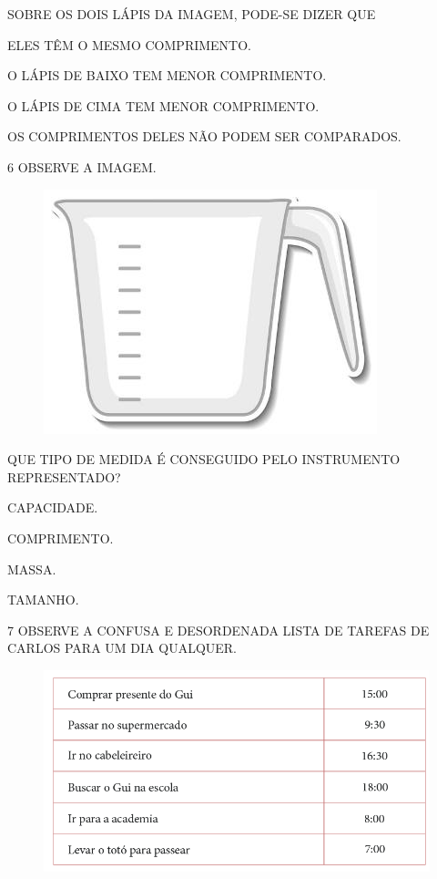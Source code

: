 SOBRE OS DOIS LÁPIS DA IMAGEM, PODE-SE DIZER QUE

\begin{escolha}[itemsep=0pt]
\item ELES TÊM O MESMO COMPRIMENTO.

\item O LÁPIS DE BAIXO TEM MENOR COMPRIMENTO.

\item O LÁPIS DE CIMA TEM MENOR COMPRIMENTO.

\item OS COMPRIMENTOS DELES NÃO PODEM SER COMPARADOS.
\end{escolha}

\pagebreak
\num{6} OBSERVE A IMAGEM.


\begin{figure}[htpb!]
\centering
\includegraphics[width=.2\textwidth]{media/image107.jpg}
\end{figure}

QUE TIPO DE MEDIDA É CONSEGUIDO PELO INSTRUMENTO REPRESENTADO?

\begin{escolha}[itemsep=0pt]
\item CAPACIDADE.

\item COMPRIMENTO.

\item MASSA.

\item TAMANHO.
\end{escolha}

\num{7} OBSERVE A CONFUSA E DESORDENADA LISTA DE TAREFAS DE CARLOS PARA UM DIA
QUALQUER.

\begin{figure}[htpb!]
\centering
\includegraphics[width=.6\textwidth]{./media/SAEB_1ANO_MAT_FIGURA115.png}
\end{figure}

